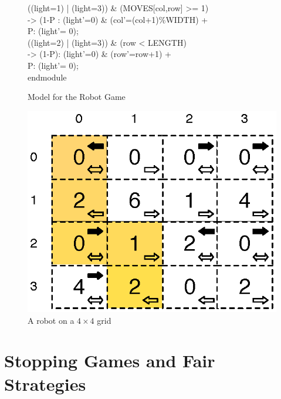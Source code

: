 \begin{figure}[t]
\begin{minipage}[b]{0.45\linewidth}
\begin{tabbing}
\>[r\_r] ((light=1) | (light=3)) \& (MOVES[col,row] >= 1)\\
\>                    \>\>-> \> (1-P : (light'=0) \& (col'=(col+1)\%WIDTH) + \\
\>                     \>\>\> P: (light'= 0); \\[1ex]
\>[r\_f] ((light=2) | (light=3)) \& (row < LENGTH) \\
\>                    \>\>-> \> (1-P): (light'=0) \& (row'=row+1)  + \\
\>                     \>\>\> P: (light'= 0);\\[1ex]
endmodule\\[-5ex]
\end{tabbing}
\caption{Model for the Robot Game} \label{fig:robot_game_model}
\end{minipage}
\hspace{0.5cm}
\begin{minipage}[b]{0.45\linewidth}
\fontsize{6.6}{6.6}\selectfont\ttfamily
\centering
\includegraphics[scale=0.45]{Figs/robotMovesRewards.eps}\hspace{4em}\mbox{}

\vspace{7em}
\caption{A robot on a $4 \times 4$ grid} \label{fig:robot_game_grid}
\end{minipage}
\end{figure}
\fi


\section{Stopping Games and Fair Strategies}\label{sec:fair-strats}

